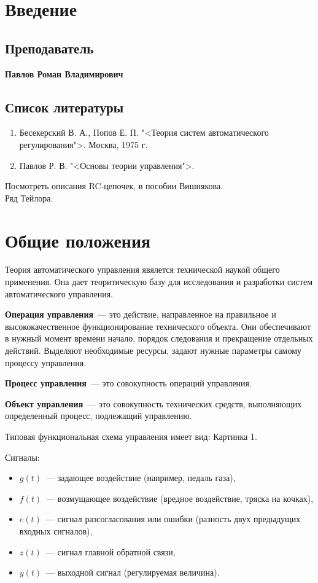 \section{Введение}
\subsection{Преподаватель}
\textbf{Павлов Роман Владимирович}

\subsection{Список литературы}
\begin{enumerate}
	\item Бесекерский В. А., Попов Е. П. "<Теория систем автоматического регулирования">. Москва, 1975 г.
	\item Павлов Р. В. "<Основы теории управления">.
\end{enumerate}

Посмотреть описания RC-цепочек, в пособии Вишнякова.\\
Ряд Тейлора.

\section{Общие положения}
Теория автоматического управления явялется технической наукой общего применения. Она дает теоритическую базу для исследования и разработки систем автоматического управления.

\textbf{Операция управления}~--- это действие, направленное на правильное и высококачественное функционирование технического объекта. Они обеспечивают в нужный момент времени начало, порядок следования и прекращение отдельных действий. Выделяют необходимые ресурсы, задают нужные параметры самому процессу управления.

\textbf{Процесс управления}~--- это совокупность операций управления.

\textbf{Объект управления}~--- это совокупность технических средств, выполняющих определенный процесс, подлежащий управлению.

Типовая функциональная схема управления имеет вид:
Картинка 1.

Сигналы:
\begin{itemize}
	\item $g(t)$~--- задающее воздействие (например, педаль газа),
	\item $f(t)$~--- возмущающее воздействие (вредное воздействие, тряска на кочках),
	\item $e(t)$~--- сигнал разсогласования или ошибки (разность двух предыдущих входных сигналов),
	\item $z(t)$~--- сигнал главной обратной связи,
	\item $y(t)$~--- выходной сигнал (регулируемая величина).
\end{itemize}

